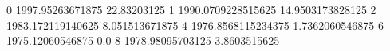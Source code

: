 0 1997.95263671875 22.83203125
1 1990.0709228515625 14.9503173828125
2 1983.172119140625 8.051513671875
4 1976.8568115234375 1.7362060546875
6 1975.12060546875 0.0
8 1978.98095703125 3.8603515625
